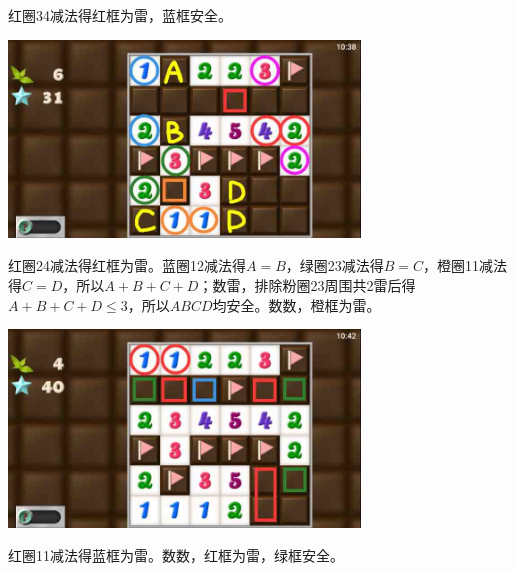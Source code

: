 红圈34减法得红框为雷，蓝框安全。
\begin{center}
    \includegraphics[width=0.7\textwidth]{puzzlelow/236-5.jpg}
\end{center}
红圈24减法得红框为雷。蓝圈12减法得$A=B$，绿圈23减法得$B=C$，橙圈11减法得$C=D$，所以$A+B+C+D$；数雷，排除粉圈23周围共2雷后得$A+B+C+D\le 3$，所以$ABCD$均安全。数数，橙框为雷。
\begin{center}
    \includegraphics[width=0.7\textwidth]{puzzlelow/236-6.jpg}
\end{center}
红圈11减法得蓝框为雷。数数，红框为雷，绿框安全。


